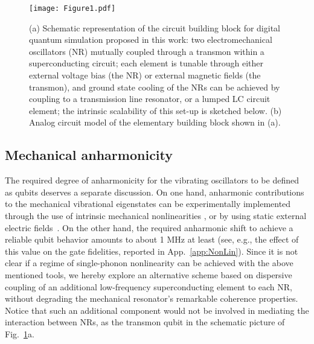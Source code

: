\documentclass[aps,twocolumn,groupedaddress,superscriptaddress,floatfix,amsmath,amssymb,prb]{revtex4-1}
\begin{document}
\begin{figure}[t]
\centering
\texttt{[image: Figure1.pdf]} 
\caption{(a) Schematic representation of the circuit building block for digital quantum simulation proposed in this work: two electromechanical oscillators (NR) mutually coupled through a transmon within a superconducting circuit; each element is tunable through either external voltage bias (the NR) or external magnetic fields (the transmon), {and ground state cooling of the NRs can be achieved by coupling to a transmission line resonator, or a lumped LC circuit element}; the intrinsic scalability of this set-up is sketched below. (b) Analog circuit model of the elementary building block shown in (a).}
\label{fig:scheme}
\end{figure}

\subsection{Mechanical anharmonicity} 
\label{sec:mech_anharm}

The required degree of anharmonicity for the vibrating oscillators to be defined as qubits deserves a separate discussion. On one hand, anharmonic contributions to the mechanical vibrational eigenstates can be experimentally implemented through the use of intrinsic mechanical nonlinearities \cite{Postma2005,Kozinsky2006}, or by using static external electric fields~\cite{Kozinsky2006,Agarwal2006,Khan2013,Rips2014}.
On the other hand, the required anharmonic shift to achieve a reliable qubit behavior amounts to about 1 MHz at least (see, e.g., the effect of this value on the gate fidelities, reported in App.~\ref{app:NonLin}). Since it is not clear if a regime of single-phonon nonlinearity can be achieved with the above mentioned tools, we hereby explore an alternative scheme based on dispersive coupling of an additional low-frequency superconducting element to each NR, without degrading the mechanical resonator's remarkable coherence properties. Notice that such an additional component would not be involved in mediating the interaction between NRs, as the transmon qubit in the schematic picture of Fig.~\ref{fig:scheme}a. 
\end{document}
